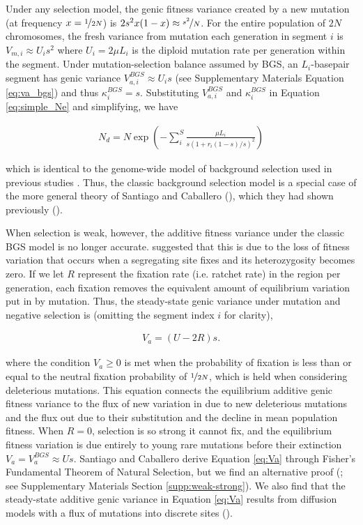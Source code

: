 \documentclass[11pt]{article}
\begin{document}
Under any selection model, the genic fitness variance created by a new mutation
(at frequency $x=\nicefrac{1}{2N}$) is $2s^2 x(1-x) \approx \nicefrac{s^2}{N}$.
For the entire population of $2N$ chromosomes, the fresh variance from mutation
each generation in segment $i$ is $V_{m,i} \approx U_is^2$ where $U_i = 2\mu
L_i$ is the diploid mutation rate per generation within the segment. Under
mutation-selection balance assumed by BGS, an $L_i$-basepair segment has genic
variance $V_{a,i}^{BGS} \approx U_i s$ (see Supplementary Materials Equation
\ref{eq:va_bgs}) and thus $\kappa_i^{BGS} = s$. Substituting $V_{a,i}^{BGS}$
and $\kappa_i^{BGS}$ in Equation \eqref{eq:simple_Ne} and simplifying, we have

\begin{align}
    N_d = N \exp \left( - \sum_i^S \frac{\mu L_i}{s(1 + r_i(1-s)/s)^2} \right) 
\end{align}

which is identical to the genome-wide model of background selection used in
previous studies \parencite{McVicker2009-ax,Elyashiv2016-vt,Murphy2022-sj}.
Thus, the classic background selection model is a special case of the more
general theory of Santiago and Caballero (\citeyear{Santiago2016-mu}), which
they had shown previously (\citeyear{Santiago1998-bs}).

When selection is weak, however, the additive fitness variance under the
classic BGS model is no longer accurate. \textcite{Santiago2016-mu} suggested
that this is due to the loss of fitness variation that occurs when a
segregating site fixes and its heterozygosity becomes zero. If we let $R$
represent the fixation rate (i.e. ratchet rate) in the region per generation,
each fixation removes the equivalent amount of equilibrium variation put in by
mutation. Thus, the steady-state genic variance under mutation and negative
selection is (omitting the segment index $i$ for clarity),

\begin{align}
  \label{eq:Va}
  V_{a} = (U - 2 R)s. 
\end{align}

where the condition $V_a \ge 0$ is met when the probability of fixation is less
than or equal to the neutral fixation probability of $\nicefrac{1}{2N}$, which
is held when considering deleterious mutations. This equation connects the
equilibrium additive genic fitness variance to the flux of new variation in due
to new deleterious mutations and the flux out due to their substitution and the
decline in mean population fitness. When $R=0$, selection is so strong it
cannot fix, and the equilibrium fitness variation is due entirely to young rare
mutations before their extinction $V_a = V_a^{BGS} \approx Us$. Santiago and
Caballero derive Equation \eqref{eq:Va} through Fisher's Fundamental Theorem of
Natural Selection, but we find an alternative proof (\cite{Higgs1995-xc}; see
Supplementary Materials Section \ref{supp:weak-strong}). We also find that the
steady-state additive genic variance in Equation \eqref{eq:Va} results from
diffusion models with a flux of mutations into discrete sites
(\cite{Kimura1969-jw}). 
\end{document}
